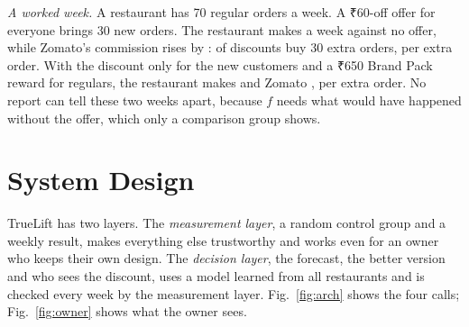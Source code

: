 \documentclass[conference]{IEEEtran}
\begin{document}
\emph{A worked week.} A restaurant has 70 regular orders a week. A ₹60-off offer for everyone brings
30 new orders. The restaurant makes  a week against no offer, while Zomato's
commission rises by :  of discounts buy 30 extra orders,
 per extra order. With the discount only for the new customers and a ₹650
Brand Pack reward for regulars, the restaurant makes  and Zomato
,  per extra order. No report can tell these two weeks
apart, because $f$ needs what would have happened without the offer, which only a comparison group shows.

\section{System Design}
\label{sec:design}

TrueLift has two layers. The \emph{measurement layer}, a random control group and a weekly result,
makes everything else trustworthy and works even for an owner who keeps their own design. The
\emph{decision layer}, the forecast, the better version and who sees the discount, uses a model learned
from all restaurants and is checked every week by the measurement layer. Fig.~\ref{fig:arch} shows the
four calls; Fig.~\ref{fig:owner} shows what the owner sees.
\end{document}
